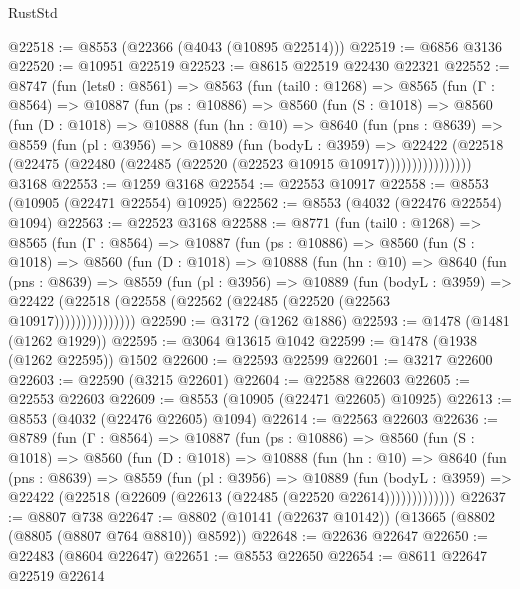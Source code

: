\begin{lexlean}{RustStd}
\begin{coremodule}
@22518 := @8553 (@22366 (@4043 (@10895 @22514)))
@22519 := @6856 @3136
@22520 := @10951 @22519
@22523 := @8615 @22519 @22430 @22321
@22552 := @8747
    (fun (lets0 : @8561) =>
    @8563
      (fun (tail0 : @1268) =>
      @8565
        (fun (Γ : @8564) =>
        @10887
          (fun (ps : @10886) =>
          @8560
            (fun (S : @1018) =>
            @8560
              (fun (D : @1018) =>
              @10888
                (fun (hn : @10) =>
                @8640
                  (fun (pns : @8639) =>
                  @8559
                    (fun (pl : @3956) =>
                    @10889
                      (fun (bodyL : @3959) =>
                      @22422
                        (@22518
                          (@22475 (@22480 (@22485 (@22520 (@22523 @10915 @10917))))))))))))))))
    @3168
@22553 := @1259 @3168
@22554 := @22553 @10917
@22558 := @8553 (@10905 (@22471 @22554) @10925)
@22562 := @8553 (@4032 (@22476 @22554) @1094)
@22563 := @22523 @3168
@22588 := @8771
    (fun (tail0 : @1268) =>
    @8565
      (fun (Γ : @8564) =>
      @10887
        (fun (ps : @10886) =>
        @8560
          (fun (S : @1018) =>
          @8560
            (fun (D : @1018) =>
            @10888
              (fun (hn : @10) =>
              @8640
                (fun (pns : @8639) =>
                @8559
                  (fun (pl : @3956) =>
                  @10889
                    (fun (bodyL : @3959) =>
                    @22422 (@22518 (@22558 (@22562 (@22485 (@22520 (@22563 @10917)))))))))))))))
@22590 := @3172 (@1262 @1886)
@22593 := @1478 (@1481 (@1262 @1929))
@22595 := @3064 @13615 @1042
@22599 := @1478 (@1938 (@1262 @22595)) @1502
@22600 := @22593 @22599
@22601 := @3217 @22600
@22603 := @22590 (@3215 @22601)
@22604 := @22588 @22603
@22605 := @22553 @22603
@22609 := @8553 (@10905 (@22471 @22605) @10925)
@22613 := @8553 (@4032 (@22476 @22605) @1094)
@22614 := @22563 @22603
@22636 := @8789
    (fun (Γ : @8564) =>
    @10887
      (fun (ps : @10886) =>
      @8560
        (fun (S : @1018) =>
        @8560
          (fun (D : @1018) =>
          @10888
            (fun (hn : @10) =>
            @8640
              (fun (pns : @8639) =>
              @8559
                (fun (pl : @3956) =>
                @10889
                  (fun (bodyL : @3959) =>
                  @22422 (@22518 (@22609 (@22613 (@22485 (@22520 @22614)))))))))))))
@22637 := @8807 @738
@22647 := @8802 (@10141 (@22637 @10142)) (@13665 (@8802 (@8805 (@8807 @764 @8810)) @8592))
@22648 := @22636 @22647
@22650 := @22483 (@8604 @22647)
@22651 := @8553 @22650
@22654 := @8611 @22647 @22519 @22614

\end{coremodule}
\end{lexlean}
